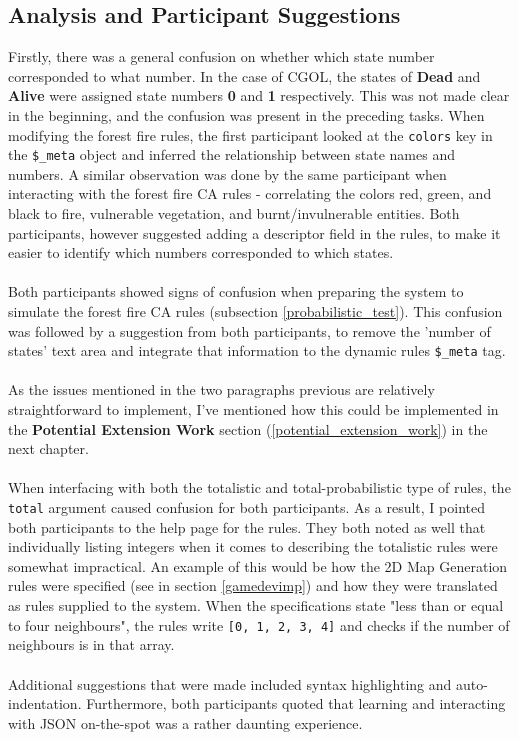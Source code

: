\subsection{Analysis and Participant Suggestions} \label{analysis_suggestions}
Firstly, there was a general confusion on whether which state number corresponded to what number. In the case of CGOL, the states of \textbf{Dead} and \textbf{Alive} were assigned state numbers \textbf{0} and \textbf{1} respectively. This was not made clear in the beginning, and the confusion was present in the preceding tasks. When modifying the forest fire rules, the first participant looked at the \texttt{colors} key in the \texttt{\$\_meta} object and inferred the relationship between state names and numbers. A similar observation was done by the same participant when interacting with the forest fire CA rules - correlating the colors red, green, and black to fire, vulnerable vegetation, and burnt/invulnerable entities. Both participants, however suggested adding a descriptor field in the rules, to make it easier to identify which numbers corresponded to which states. 
\\ \\
Both participants showed signs of confusion when preparing the system to simulate the forest fire CA rules (subsection \ref{probabilistic_test}). This confusion was followed by a suggestion from both participants, to remove the 'number of states' text area and integrate that information to the dynamic rules \texttt{\$\_meta} tag. 
\\ \\
As the issues mentioned in the two paragraphs previous are relatively straightforward to implement, I've mentioned how this could be implemented in the \textbf{Potential Extension Work} section (\ref{potential_extension_work}) in the next chapter.
\\ \\
When interfacing with both the totalistic and total-probabilistic type of rules, the \texttt{total} argument caused confusion for both participants. As a result, I pointed both participants to the help page for the rules. They both noted as well that individually listing integers when it comes to describing the totalistic rules were somewhat impractical. An example of this would be how the 2D Map Generation rules were specified (see in section \ref{gamedevimp}) and how they were translated as rules supplied to the system. When the specifications state "less than or equal to four neighbours", the rules write \texttt{[0, 1, 2, 3, 4]} and checks if the number of neighbours is in that array.
\\ \\
Additional suggestions that were made included syntax highlighting and auto-indentation. Furthermore, both participants quoted that learning and interacting with JSON on-the-spot was a rather daunting experience. 